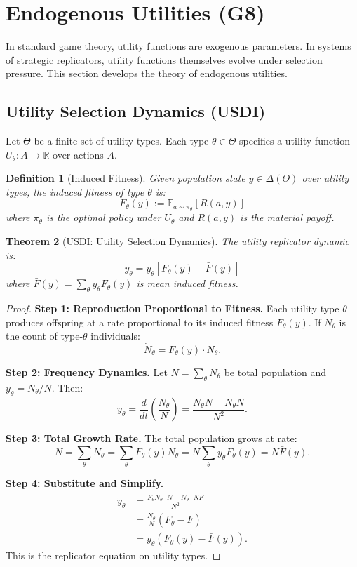 \documentclass[12pt]{article}
\newtheorem{theorem}{Theorem}[section]
\newtheorem{definition}[theorem]{Definition}
\newcommand{\R}{\mathbb{R}}
\newcommand{\E}{\mathbb{E}}
\begin{document}
\section{Endogenous Utilities (G8)}
\label{sec:g8}

In standard game theory, utility functions are exogenous parameters. In systems of strategic replicators, utility functions themselves evolve under selection pressure. This section develops the theory of endogenous utilities.

\subsection{Utility Selection Dynamics (USDI)}

Let $\Theta$ be a finite set of utility types. Each type $\theta \in \Theta$ specifies a utility function $U_\theta: A \to \R$ over actions $A$.

\begin{definition}[Induced Fitness]
Given population state $y \in \Delta(\Theta)$ over utility types, the \emph{induced fitness} of type $\theta$ is:
\[
F_\theta(y) := \E_{a \sim \pi_\theta}[R(a, y)]
\]
where $\pi_\theta$ is the optimal policy under $U_\theta$ and $R(a, y)$ is the material payoff.
\end{definition}

\begin{theorem}[USDI: Utility Selection Dynamics]
\label{thm:usdi}
The utility replicator dynamic is:
\[
\dot{y}_\theta = y_\theta \left[ F_\theta(y) - \bar{F}(y) \right]
\]
where $\bar{F}(y) = \sum_\theta y_\theta F_\theta(y)$ is mean induced fitness.
\end{theorem}

\begin{proof}
\textbf{Step 1: Reproduction Proportional to Fitness.}
Each utility type $\theta$ produces offspring at a rate proportional to its induced fitness $F_\theta(y)$. If $N_\theta$ is the count of type-$\theta$ individuals:
\[
\dot{N}_\theta = F_\theta(y) \cdot N_\theta.
\]

\textbf{Step 2: Frequency Dynamics.}
Let $N = \sum_\theta N_\theta$ be total population and $y_\theta = N_\theta / N$. Then:
\[
\dot{y}_\theta = \frac{d}{dt} \left( \frac{N_\theta}{N} \right) = \frac{\dot{N}_\theta N - N_\theta \dot{N}}{N^2}.
\]

\textbf{Step 3: Total Growth Rate.}
The total population grows at rate:
\[
\dot{N} = \sum_\theta \dot{N}_\theta = \sum_\theta F_\theta(y) N_\theta = N \sum_\theta y_\theta F_\theta(y) = N \bar{F}(y).
\]

\textbf{Step 4: Substitute and Simplify.}
\begin{align*}
\dot{y}_\theta &= \frac{F_\theta N_\theta \cdot N - N_\theta \cdot N \bar{F}}{N^2} \\
&= \frac{N_\theta}{N} \left( F_\theta - \bar{F} \right) \\
&= y_\theta \left( F_\theta(y) - \bar{F}(y) \right).
\end{align*}
This is the replicator equation on utility types.
\end{proof}
\end{document}
